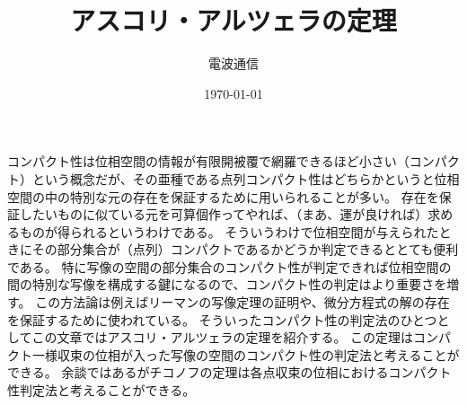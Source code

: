 \documentclass[leqno]{jsarticle}
\title{アスコリ・アルツェラの定理}
\author{電波通信}
\date{\today}
\begin{document}
\maketitle
コンパクト性は位相空間の情報が有限開被覆で網羅できるほど小さい（コンパクト）という概念だが、その亜種である点列コンパクト性はどちらかというと位相空間の中の特別な元の存在を保証するために用いられることが多い。
存在を保証したいものに似ている元を可算個作ってやれば、（まあ、運が良ければ）求めるものが得られるというわけである。
そういうわけで位相空間が与えられたときにその部分集合が（点列）コンパクトであるかどうか判定できるととても便利である。
特に写像の空間の部分集合のコンパクト性が判定できれば位相空間の間の特別な写像を構成する鍵になるので、コンパクト性の判定はより重要さを増す。
この方法論は例えばリーマンの写像定理の証明や、微分方程式の解の存在を保証するために使われている。
そういったコンパクト性の判定法のひとつとしてこの文章ではアスコリ・アルツェラの定理を紹介する。
この定理はコンパクト一様収束の位相が入った写像の空間のコンパクト性の判定法と考えることができる。
余談ではあるがチコノフの定理は各点収束の位相におけるコンパクト性判定法と考えることができる。
\end{document}
